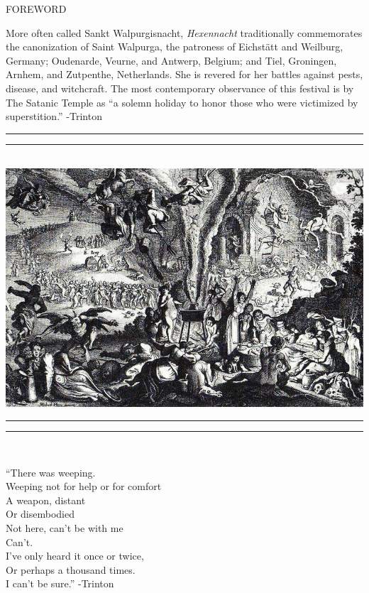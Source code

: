 \documentclass[11pt]{article}
\begin{document}
\begin{center}
\huge FOREWORD
\end{center}

\begingroup
\begin{center}
More often called Sankt Walpurgisnacht, \textit{Hexennacht} traditionally commemorates the canonization of Saint Walpurga, the patroness of Eichstätt and Weilburg, Germany; Oudenarde, Veurne, and Antwerp, Belgium; and Tiel, Groningen, Arnhem, and Zutpenthe, Netherlands. She is revered for her battles against pests, disease, and witchcraft. The most contemporary observance of this festival is by The Satanic Temple as ``a solemn holiday to honor those who were victimized by superstition.''
\rightskip\leftskip
\phantom{text} \hfill -Trinton
\end{center}
\endgroup

\begingroup
\begin{center}
\rule{\textwidth}{1.6pt}\vspace*{-\baselineskip}\vspace*{1pt}
\rule{\textwidth}{0.4pt}\\[\baselineskip]
\includegraphics[scale=0.5]{hex_1.jpeg}
\rule{\textwidth}{0.4pt}\vspace*{-\baselineskip}\vspace{2pt}
\rule{\textwidth}{1.6pt}\\[\baselineskip]
\end{center}
\endgroup

\begingroup
\begin{center}
``There was weeping. \\ Weeping not for help or for comfort \\  A weapon, distant \\  Or disembodied \\ Not here, can't be with me \\ Can't. \\ I've only heard it once or twice, \\ Or perhaps a thousand times. \\ I can't be sure.''  -Trinton
\end{center}
\endgroup
\end{document}
